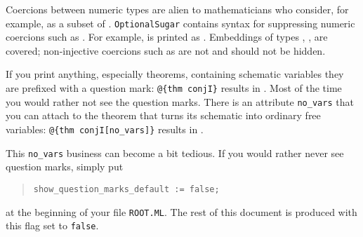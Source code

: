 \begin{isabellebody}
\begin{isamarkuptext}
\begin{itemize}
\end{itemize}%
\end{isamarkuptext}%
\isamarkuptrue%
%
\isamarkuptrue%
%
\begin{isamarkuptext}%
Coercions between numeric types are alien to mathematicians who
consider, for example,  as a subset of .
\texttt{OptionalSugar} contains syntax for suppressing numeric coercions such
as  \isa{{\isacharcolon}{\isacharcolon}} . For example,
 is printed as . Embeddings of types
, ,  are covered; non-injective coercions such
as  \isa{{\isacharcolon}{\isacharcolon}}  are not and should not be
hidden.%
\end{isamarkuptext}%
\isamarkuptrue%
%
\isamarkuptrue%
%
\isamarkuptrue%
%
\begin{isamarkuptext}%
If you print anything, especially theorems, containing
schematic variables they are prefixed with a question mark:
\verb!@!\verb!{thm conjI}! results in . Most of the time
you would rather not see the question marks. There is an attribute
\verb!no_vars! that you can attach to the theorem that turns its
schematic into ordinary free variables: \verb!@!\verb!{thm conjI[no_vars]}!
results in .

This \verb!no_vars! business can become a bit tedious.
If you would rather never see question marks, simply put
\begin{quote}
\verb|show_question_marks_default := false|\verb!;!
\end{quote}
at the beginning of your file \texttt{ROOT.ML}.
The rest of this document is produced with this flag set to \texttt{false}.


\end{isamarkuptext}
\end{isabellebody}
